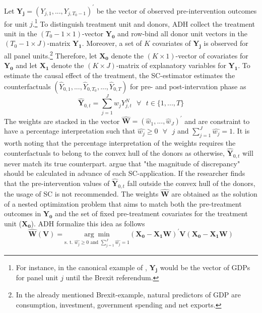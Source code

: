 Let $\boldsymbol{Y_j} = (Y_{j,1}, ..., Y_{j,T_{0}-1})^\prime$ be the vector of observed pre-intervention outcomes for unit $j$.\footnote{For instance, in the canonical example of \cite{abadie:2003}, $\boldsymbol{Y_j}$ would be the vector of \ac{GDP}s for panel unit $j$ until the Brexit referendum.} To distinguish treatment unit and donors, \ac{ADH} collect the treatment unit in the $(T_{0}-1 \times 1)$-vector $\boldsymbol{Y_0}$ and row-bind all donor unit vectors in the $(T_{0}-1 \times J)$-matrix $\boldsymbol{Y_1}$. Moreover, a set of $K$ covariates of $\boldsymbol{Y_j}$ is observed for all panel units.\footnote{In the already mentioned Brexit-example, natural predictors of \ac{GDP} are consumption, investment, government spending and net exports.} Therefore, let $\boldsymbol{X_0}$ denote the $(K \times 1)$-vector of covariates for $\boldsymbol{Y_0}$ and let $\boldsymbol{X_1}$ denote the $(K \times J)$-matrix of explanatory variables for $\boldsymbol{Y_1}$. To estimate the causal effect of the treatment, the \ac{SC}-estimator estimates the counterfactuals $(\widehat{Y}_{0,1}, ...,\widehat{Y}_{0,T_0},..., \widehat{Y}_{0,T})$ for pre- and post-intervation phase as 
\[
\widehat{\boldsymbol{Y}}_{0,t} = \sum_{j = 1}^{J} \widehat{w}_j Y^{N}_{j,t} \text{ } \forall \text{ } t \in \{1,...,T\}
\]
The weights are stacked in the vector $\boldsymbol{\widehat{W}} = (\widehat{w}_1, ... , \widehat{w}_J)^\prime$ and are constraint to have a percentage interpretation such that $\widehat{w_j} \geq 0 \text{ } \forall \text{ } j$ and $\sum_{j = 1}^{J} \widehat{w_j} = 1$. It is worth noting that the percentage interpretation of the weights requires the counterfactuals to belong to the convex hull of the donors as otherwise, $\widehat{\boldsymbol{Y}}_{0,t}$ will never match its true counterpart. \cite{abadie:2010} argue that "the magnitude of discrepancy" should be calculated in advance of each \ac{SC}-application. If the researcher finds that the pre-intervention values of $\widehat{\boldsymbol{Y}}_{0,t}$ fall outside the convex hull of the donors, the usage of \ac{SC} is not recommended. The weights $\boldsymbol{\widehat{W}}$ are obtained as the solution of a nested optimization problem that aims to match both the pre-treatment outcomes in $\boldsymbol{Y_0}$ and the set of fixed pre-treatment covariates for the treatment unit ($\boldsymbol{X_0}$). \ac{ADH} formalize this idea as follows
\[
\widehat{\boldsymbol{W}}(\boldsymbol{V}) = 
\underset{\text{s. t. }\widehat{w_j} \geq 0 \text{ and } \sum_{j = 1}^{J} \widehat{w_j} = 1}{\arg\min}
(\boldsymbol{X_0} - \boldsymbol{X_1}\boldsymbol{W})^\prime \boldsymbol{V}(\boldsymbol{X_0} - \boldsymbol{X_1}\boldsymbol{W})
\]
